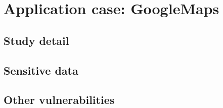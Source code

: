 \section{Application case: GoogleMaps}
\label{sec:google_maps}
	\subsection{Study detail}
	\subsection{Sensitive data}
	\subsection{Other vulnerabilities}